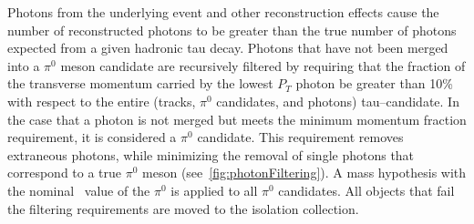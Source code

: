 Photons from the underlying event and other reconstruction effects cause the
number of reconstructed photons to be greater than the true number of photons
expected from a given hadronic tau decay.  Photons that have not been merged into
a $\pi^0$ meson candidate are recursively filtered by requiring that the
fraction of the transverse momentum carried by the lowest $P_T$ photon be
greater than 10\% with respect to the entire (tracks, $\pi^0$ candidates, and
photons) tau--candidate. In the case that a photon is not merged but meets the
minimum momentum fraction requirement, it is considered a $\pi^0$
candidate.  This requirement removes extraneous photons, while minimizing the
removal of single photons that correspond to a true $\pi^0$ meson
(see~\ref{fig:photonFiltering}). A mass hypothesis with the
nominal~\cite{PDG} value of the $\pi^0$ is applied to all $\pi^0$ candidates.
All objects that fail the filtering requirements are moved to the isolation
collection.

